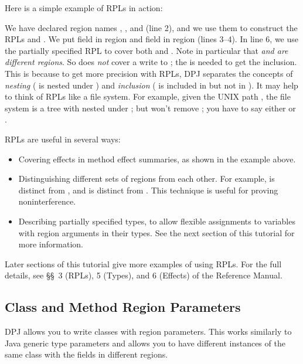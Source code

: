 Here is a simple example of RPLs in action:
%

%
We have declared region names , , and  (line 2),
and we use them to construct the RPLs  and .  We put
field  in region  and field  in region
 (lines 3--4).  In line 6, we use the partially specified RPL
 to cover both  and .  Note in particular
that \emph{ and  are different regions}.  So
 does \emph{not} cover a write to ; the \kwd{*}
is needed to get the inclusion.  This is because to get more precision
with RPLs, DPJ separates the concepts of \emph{nesting} ( is
nested under ) and \emph{inclusion} ( is included in
 but not in ).  It may help to think of RPLs like a
file system.  For example, given the UNIX path , the file
system is a tree with  nested under ; but  won't remove ; you have to say either 
or .

RPLs are useful in several ways:
%
\begin{itemize}
%
\item Covering effects in method effect summaries, as shown in the
  example above.
%
\item Distinguishing different sets of regions from each other.  For
  example,  is distinct from , and  is
  distinct from .  This technique is useful for proving
  noninterference.
%
\item Describing partially specified types, to allow flexible
  assignments to variables with region arguments in their types.  See
  the next section of this tutorial for more information.
%
\end{itemize}
%
Later sections of this tutorial give more examples of using RPLs.  For
the full details, see \S\S~3 (RPLs), 5 (Types), and 6 (Effects) of the
Reference Manual.

\subsection{Class and Method Region Parameters%
\label{sec:overview:params}}

 DPJ allows you to write classes with
region parameters.  This works similarly to Java generic type
parameters and allows you to have different instances of the same
class with the fields in different regions.

